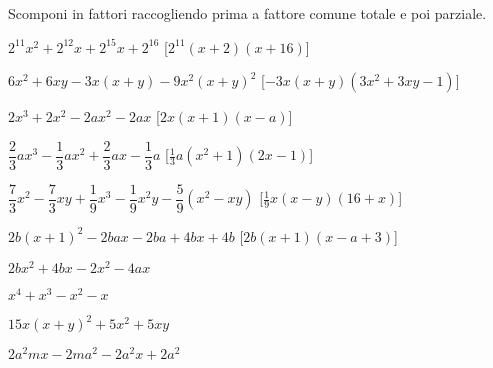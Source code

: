 % 

\begin{esercizio}[\Ast]
\label{ese:div.016}
Scomponi in fattori raccogliendo prima a fattore comune totale e poi parziale.
\begin{enumeratea}
 \item $2^{11}x^{2}+2^{12}x+2^{15}x+2^{16}$
  \hfill [$2^{11}(x+2)(x+16)$]
 \item $6x^{2}+6xy-3x(x+y)-9x^{2}(x+y)^{2}$
  \hfill [$-3x(x+y)\left(3x^2+3xy-1\right)$]
 \item $2x^{3}+2x^{2}-2ax^{2}-2ax$
  \hfill [$2x(x+1)(x-a)$]
 \item $\dfrac{2}{3}ax^{3}-\dfrac{1}{3}ax^{2}+\dfrac{2}{3}ax-\dfrac{1}{3}a$
  \hfill [$\frac{1}{3}a(x^{2}+1)(2x-1)$]
 \item $\dfrac{7}{3}x^{2}-\dfrac{7}{3}xy+\dfrac{1}{9}x^{3}-
        \dfrac{1}{9}x^{2}y-\dfrac{5}{9}(x^{2}-xy)$
  \hfill [$\frac{1}{9}x(x-y)(16+x)$]
 \item $2b(x+1)^{2}-2bax-2ba+4bx+4b$
  \hfill [$2b(x+1)(x-a+3)$]
 \item $2bx^{2}+4bx-2x^{2}-4ax$
 \item $x^{4}+x^{3}-x^{2}-x$
 \item $15x(x+y)^{2}+5x^{2}+5xy$
 \item $2a^{2}mx-2ma^{2}-2a^{2}x+2a^{2}$
\end{enumeratea}
\end{esercizio}

